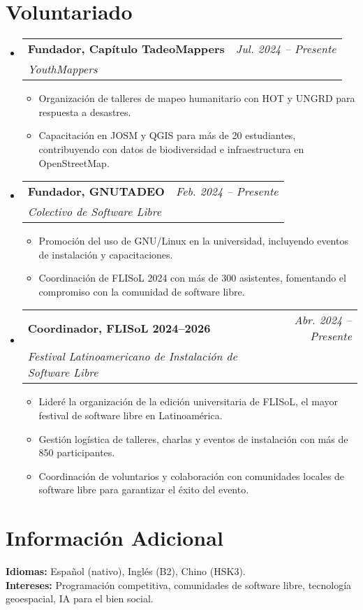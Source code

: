 \documentclass[a4paper,11pt]{article}
\makeatletter
\newcommand{\resumeProject}[4]{
\vspace{0.5mm}\item
    \begin{tabular*}{0.98\textwidth}[t]{l@{\extracolsep{\fill}}r}
        \textbf{#1} & \textit{\footnotesize{#3}} \\
        \footnotesize{\textit{#2}} & \footnotesize{#4}
    \end{tabular*}
    \vspace{-2.4mm}
}
\newcommand{\resumeSubHeadingListStart}{\begin{itemize}[leftmargin=*,labelsep=1mm]}
\newcommand{\resumeItemListStart}{\begin{itemize}[leftmargin=*,labelsep=1mm,itemsep=0.5mm]}
\newcommand{\resumeSubHeadingListEnd}{\end{itemize}\vspace{2mm}}
\newcommand{\resumeItemListEnd}{\end{itemize}\vspace{-2mm}}
\makeatother
\begin{document}
\section{\textbf{Voluntariado}}
\resumeSubHeadingListStart

\resumeProject
  {Fundador, Capítulo TadeoMappers}{YouthMappers}{Jul. 2024 -- Presente}{ }
\resumeItemListStart
  \item Organización de talleres de mapeo humanitario con HOT y UNGRD para respuesta a desastres.
  \item Capacitación en JOSM y QGIS para más de 20 estudiantes, contribuyendo con datos de biodiversidad e infraestructura en OpenStreetMap.
\resumeItemListEnd

\resumeProject
  {Fundador, GNUTADEO}{Colectivo de Software Libre}{Feb. 2024 -- Presente}{ }
\resumeItemListStart
  \item Promoción del uso de GNU/Linux en la universidad, incluyendo eventos de instalación y capacitaciones.
  \item Coordinación de FLISoL 2024 con más de 300 asistentes, fomentando el compromiso con la comunidad de software libre.
\resumeItemListEnd

\resumeProject
  {Coordinador, FLISoL 2024--2026}{Festival Latinoamericano de Instalación de Software Libre}{Abr. 2024 -- Presente}{ }
\resumeItemListStart
  \item Lideré la organización de la edición universitaria de FLISoL, el mayor festival de software libre en Latinoamérica.
  \item Gestión logística de talleres, charlas y eventos de instalación con más de 850 participantes.
  \item Coordinación de voluntarios y colaboración con comunidades locales de software libre para garantizar el éxito del evento.
\resumeItemListEnd

\resumeSubHeadingListEnd

\section{\textbf{Información Adicional}}
\small{
\textbf{Idiomas:} Español (nativo), Inglés (B2), Chino (HSK3). \\
\textbf{Intereses:} Programación competitiva, comunidades de software libre, tecnología geoespacial, IA para el bien social.
}
\end{document}

